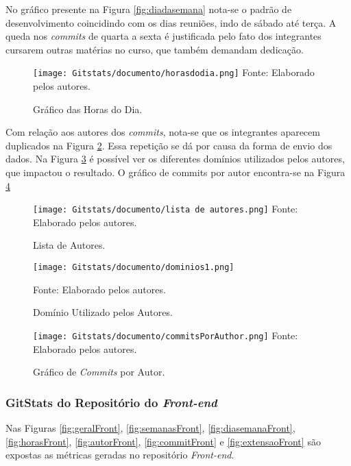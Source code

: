 \documentclass[
    12pt,               %
    openright,          %
    oneside,
    a4paper,            %
    BIBLATEX,           %
    TODO,               %
    english,            %
    brazil              %
    ]{ifsp-spo-inf-ctds}
\begin{document}
    No gráfico presente na Figura \ref{fig:diadasemana} nota-se o padrão de desenvolvimento coincidindo com os dias reuniões, indo de sábado até terça. A queda nos \emph{commits} de quarta a sexta é justificada pelo fato dos integrantes cursarem outras matérias no curso, que também demandam dedicação.

      \begin{figure}[H]
            \centering
            \caption{Gráfico das Horas do Dia.}
            \texttt{[image: Gitstats/documento/horasdodia.png]}
            {\footnotesize Fonte: Elaborado pelos autores.}
            \label{fig:horadodia}
        \end{figure} 

    Com relação aos autores dos \emph{commits}, nota-se que os integrantes aparecem duplicados na Figura \ref{fig:listaautores}. Essa repetição se dá por causa da forma de envio dos dados. Na Figura \ref{fig:dominio} é possível ver os diferentes domínios utilizados pelos autores, que impactou o resultado. O gráfico de commits por autor encontra-se na Figura \ref{fig:commitautor}

    \begin{figure}[H]
                \centering
                \caption{Lista de Autores.}
                \texttt{[image: Gitstats/documento/lista de autores.png]}
                {\footnotesize Fonte: Elaborado pelos autores.}
                \label{fig:listaautores}
            \end{figure}

    \begin{figure}[H]
            \centering
            \caption{Domínio Utilizado pelos Autores.}
            \texttt{[image: Gitstats/documento/dominios1.png]}

            {\footnotesize Fonte: Elaborado pelos autores.}
            \label{fig:dominio}
        \end{figure}  


    \begin{figure}[H]
            \centering
            \caption{Gráfico de \emph{Commits} por Autor.}
            \texttt{[image: Gitstats/documento/commitsPorAuthor.png]}
            {\footnotesize Fonte: Elaborado pelos autores.}
            \label{fig:commitautor}
    \end{figure} 



\subsubsection{GitStats do Repositório do \emph{Front-end}}
    Nas Figuras \ref{fig:geralFront}, \ref{fig:semanasFront}, \ref{fig:diasemanaFront}, \ref{fig:horasFront}, \ref{fig:autorFront}, \ref{fig:commitFront} e \ref{fig:extensaoFront} são expostas as métricas geradas no repositório \emph{Front-end}.
\end{document}
